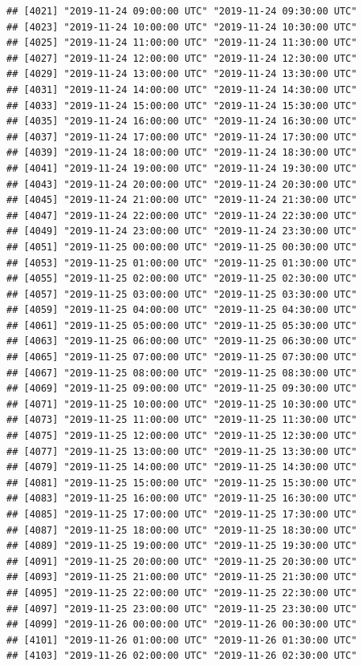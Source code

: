 \documentclass{article}\usepackage[]{graphicx}\usepackage[]{color}
\makeatletter
\newenvironment{kframe}{%
 \def\at@end@of@kframe{}%
 \ifinner\ifhmode%
  \def\at@end@of@kframe{\end{minipage}}%
  \begin{minipage}{\columnwidth}%
 \fi\fi%
 \def\FrameCommand##1{\hskip\@totalleftmargin \hskip-\fboxsep
 \colorbox{shadecolor}{##1}\hskip-\fboxsep
     \hskip-\linewidth \hskip-\@totalleftmargin \hskip\columnwidth}%
 \MakeFramed {\advance\hsize-\width
   \@totalleftmargin\z@ \linewidth\hsize
   \@setminipage}}%
 {\par\unskip\endMakeFramed%
 \at@end@of@kframe}
\newenvironment{knitrout}{}{} %
\makeatother
\begin{document}
\begin{knitrout}
\begin{kframe}
\begin{verbatim}
## [4021] "2019-11-24 09:00:00 UTC" "2019-11-24 09:30:00 UTC"
## [4023] "2019-11-24 10:00:00 UTC" "2019-11-24 10:30:00 UTC"
## [4025] "2019-11-24 11:00:00 UTC" "2019-11-24 11:30:00 UTC"
## [4027] "2019-11-24 12:00:00 UTC" "2019-11-24 12:30:00 UTC"
## [4029] "2019-11-24 13:00:00 UTC" "2019-11-24 13:30:00 UTC"
## [4031] "2019-11-24 14:00:00 UTC" "2019-11-24 14:30:00 UTC"
## [4033] "2019-11-24 15:00:00 UTC" "2019-11-24 15:30:00 UTC"
## [4035] "2019-11-24 16:00:00 UTC" "2019-11-24 16:30:00 UTC"
## [4037] "2019-11-24 17:00:00 UTC" "2019-11-24 17:30:00 UTC"
## [4039] "2019-11-24 18:00:00 UTC" "2019-11-24 18:30:00 UTC"
## [4041] "2019-11-24 19:00:00 UTC" "2019-11-24 19:30:00 UTC"
## [4043] "2019-11-24 20:00:00 UTC" "2019-11-24 20:30:00 UTC"
## [4045] "2019-11-24 21:00:00 UTC" "2019-11-24 21:30:00 UTC"
## [4047] "2019-11-24 22:00:00 UTC" "2019-11-24 22:30:00 UTC"
## [4049] "2019-11-24 23:00:00 UTC" "2019-11-24 23:30:00 UTC"
## [4051] "2019-11-25 00:00:00 UTC" "2019-11-25 00:30:00 UTC"
## [4053] "2019-11-25 01:00:00 UTC" "2019-11-25 01:30:00 UTC"
## [4055] "2019-11-25 02:00:00 UTC" "2019-11-25 02:30:00 UTC"
## [4057] "2019-11-25 03:00:00 UTC" "2019-11-25 03:30:00 UTC"
## [4059] "2019-11-25 04:00:00 UTC" "2019-11-25 04:30:00 UTC"
## [4061] "2019-11-25 05:00:00 UTC" "2019-11-25 05:30:00 UTC"
## [4063] "2019-11-25 06:00:00 UTC" "2019-11-25 06:30:00 UTC"
## [4065] "2019-11-25 07:00:00 UTC" "2019-11-25 07:30:00 UTC"
## [4067] "2019-11-25 08:00:00 UTC" "2019-11-25 08:30:00 UTC"
## [4069] "2019-11-25 09:00:00 UTC" "2019-11-25 09:30:00 UTC"
## [4071] "2019-11-25 10:00:00 UTC" "2019-11-25 10:30:00 UTC"
## [4073] "2019-11-25 11:00:00 UTC" "2019-11-25 11:30:00 UTC"
## [4075] "2019-11-25 12:00:00 UTC" "2019-11-25 12:30:00 UTC"
## [4077] "2019-11-25 13:00:00 UTC" "2019-11-25 13:30:00 UTC"
## [4079] "2019-11-25 14:00:00 UTC" "2019-11-25 14:30:00 UTC"
## [4081] "2019-11-25 15:00:00 UTC" "2019-11-25 15:30:00 UTC"
## [4083] "2019-11-25 16:00:00 UTC" "2019-11-25 16:30:00 UTC"
## [4085] "2019-11-25 17:00:00 UTC" "2019-11-25 17:30:00 UTC"
## [4087] "2019-11-25 18:00:00 UTC" "2019-11-25 18:30:00 UTC"
## [4089] "2019-11-25 19:00:00 UTC" "2019-11-25 19:30:00 UTC"
## [4091] "2019-11-25 20:00:00 UTC" "2019-11-25 20:30:00 UTC"
## [4093] "2019-11-25 21:00:00 UTC" "2019-11-25 21:30:00 UTC"
## [4095] "2019-11-25 22:00:00 UTC" "2019-11-25 22:30:00 UTC"
## [4097] "2019-11-25 23:00:00 UTC" "2019-11-25 23:30:00 UTC"
## [4099] "2019-11-26 00:00:00 UTC" "2019-11-26 00:30:00 UTC"
## [4101] "2019-11-26 01:00:00 UTC" "2019-11-26 01:30:00 UTC"
## [4103] "2019-11-26 02:00:00 UTC" "2019-11-26 02:30:00 UTC"

\end{verbatim}
\end{kframe}
\end{knitrout}
\end{document}

